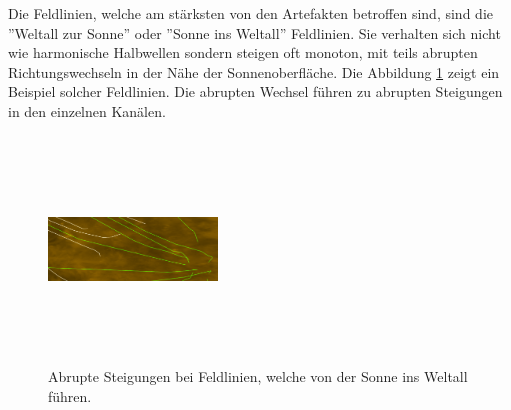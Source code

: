Die Feldlinien, welche am stärksten von den Artefakten betroffen sind, sind die ''Weltall zur Sonne'' oder ''Sonne ins Weltall'' Feldlinien. Sie verhalten sich nicht wie harmonische Halbwellen sondern steigen oft monoton, mit teils abrupten Richtungswechseln in der Nähe der Sonnenoberfläche. Die Abbildung \ref{resultate:loesung1:dct:randbehandlung:harte_richtungswechsel} zeigt ein Beispiel solcher Feldlinien. Die abrupten Wechsel führen zu abrupten Steigungen in den einzelnen Kanälen.
\begin{figure}[!htbp]
\center
\includegraphics[width=0.4\textwidth,height=6cm,keepaspectratio]{./pictures/resultate/loesung1/ringing/haar-like.png}
	\caption{Abrupte Steigungen bei Feldlinien, welche von der Sonne ins Weltall führen.}
	\label{resultate:loesung1:dct:randbehandlung:harte_richtungswechsel}
\end{figure}


